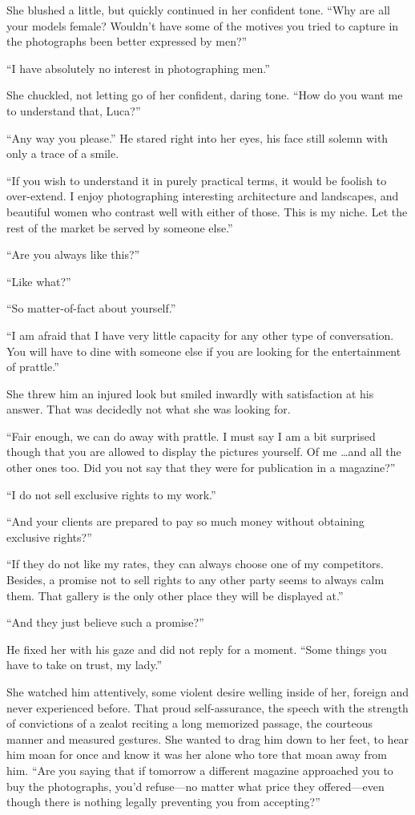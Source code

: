 She blushed a little, but quickly continued in her confident tone. ``Why are all your models female? Wouldn't have some of the motives you tried to capture in the photographs been better expressed by men?''

``I have absolutely no interest in photographing men.''

She chuckled, not letting go of her confident, daring tone. ``How do you want me to understand that, Luca?''

``Any way you please.'' He stared right into her eyes, his face still solemn with only a trace of a smile.

``If you wish to understand it in purely practical terms, it would be foolish to over-extend. I enjoy photographing interesting architecture and landscapes, and beautiful women who contrast well with either of those. This is my niche. Let the rest of the market be served by someone else.''

``Are you always like this?''

``Like what?''

``So matter-of-fact about yourself.''

``I am afraid that I have very little capacity for any other type of conversation. You will have to dine with someone else if you are looking for the entertainment of prattle.''

She threw him an injured look but smiled inwardly with satisfaction at his answer. That was decidedly not what she was looking for.

``Fair enough, we can do away with prattle. I must say I am a bit surprised though that you are allowed to display the pictures yourself. Of me \ldots and all the other ones too. Did you not say that they were for publication in a magazine?''

``I do not sell exclusive rights to my work.''

``And your clients are prepared to pay so much money without obtaining exclusive rights?''

``If they do not like my rates, they can always choose one of my competitors. Besides, a promise not to sell rights to any other party seems to always calm them. That gallery is the only other place they will be displayed at.''

``And they just believe such a promise?''

He fixed her with his gaze and did not reply for a moment. ``Some things you have to take on trust, my lady.''

She watched him attentively, some violent desire welling inside of her, foreign and never experienced before. That proud self-assurance, the speech with the strength of convictions of a zealot reciting a long memorized passage, the courteous manner and measured gestures. She wanted to drag him down to her feet, to hear him moan for once and know it was her alone who tore that moan away from him. ``Are you saying that if tomorrow a different magazine approached you to buy the photographs, you'd refuse---no matter what price they offered---even though there is nothing legally preventing you from accepting?''

